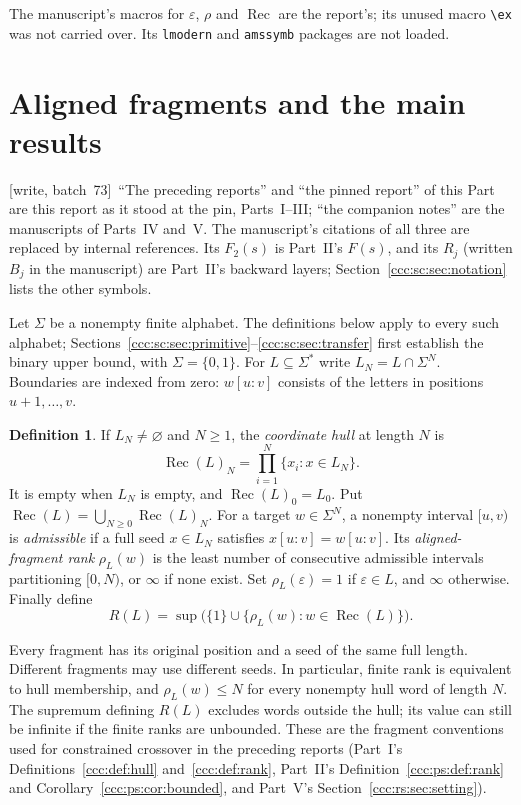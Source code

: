 \documentclass[11pt,letterpaper]{article}
\theoremstyle{definition}
\newtheorem{definition}[theorem]{Definition}
\theoremstyle{remark}
\newcommand{\eps}{\varepsilon}
\newcommand{\rec}{\operatorname{Rec}}
\newcommand{\rank}{\rho}
\newcommand{\wsevthree}{\textup{[write, batch~73]}}
\begin{document}
The manuscript's macros for $\eps$, $\rank$ and $\rec$ are the report's; its
unused macro \verb|\ex| was not carried over. Its \texttt{lmodern} and
\texttt{amssymb} packages are not loaded.

\section{Aligned fragments and the main results}\label{ccc:sc:sec:intro}

\wsevthree\ ``The preceding reports'' and ``the pinned report'' of this Part
are this report as it stood at the pin, Parts~I--III; ``the companion
notes'' are the manuscripts of Parts~IV and~V. The manuscript's citations of
all three are replaced by internal references. Its $F_2(s)$ is Part~II's
$F(s)$, and its $R_j$ (written $B_j$ in the manuscript) are Part~II's
backward layers; Section~\ref{ccc:sc:sec:notation} lists the other symbols.

Let $\Sigma$ be a nonempty finite alphabet. The definitions below apply to every such alphabet; Sections~\ref{ccc:sc:sec:primitive}--\ref{ccc:sc:sec:transfer} first establish the binary upper bound, with $\Sigma=\{0,1\}$. For $L\subseteq\Sigma^*$ write $L_N=L\cap\Sigma^N$. Boundaries are indexed from zero: $w[u:v]$ consists of the letters in positions $u+1,\ldots,v$.

\begin{definition}
If $L_N\ne\varnothing$ and $N\ge1$, the \emph{coordinate hull} at length $N$ is
\[
 \rec(L)_N=\prod_{i=1}^N\{x_i:x\in L_N\}.
\]
It is empty when $L_N$ is empty, and $\rec(L)_0=L_0$. Put $\rec(L)=\bigcup_{N\ge0}\rec(L)_N$.
For a target $w\in\Sigma^N$, a nonempty interval $[u,v)$ is \emph{admissible} if a full seed $x\in L_N$ satisfies $x[u:v]=w[u:v]$. Its \emph{aligned-fragment rank} $\rank_L(w)$ is the least number of consecutive admissible intervals partitioning $[0,N)$, or $\infty$ if none exist. Set $\rank_L(\eps)=1$ if $\eps\in L$, and $\infty$ otherwise. Finally define
\[
 R(L)=\sup\bigl(\{1\}\cup\{\rank_L(w):w\in\rec(L)\}\bigr).
\]
\end{definition}

Every fragment has its original position and a seed of the same full length. Different fragments may use different seeds. In particular, finite rank is equivalent to hull membership, and $\rank_L(w)\le N$ for every nonempty hull word of length $N$. The supremum defining $R(L)$ excludes words outside the hull; its value can still be infinite if the finite ranks are unbounded. These are the fragment conventions used for constrained crossover in the preceding reports (Part~I's Definitions~\ref{ccc:def:hull} and~\ref{ccc:def:rank}, Part~II's Definition~\ref{ccc:ps:def:rank} and Corollary~\ref{ccc:ps:cor:bounded}, and Part~V's Section~\ref{ccc:rs:sec:setting}).
\end{document}
